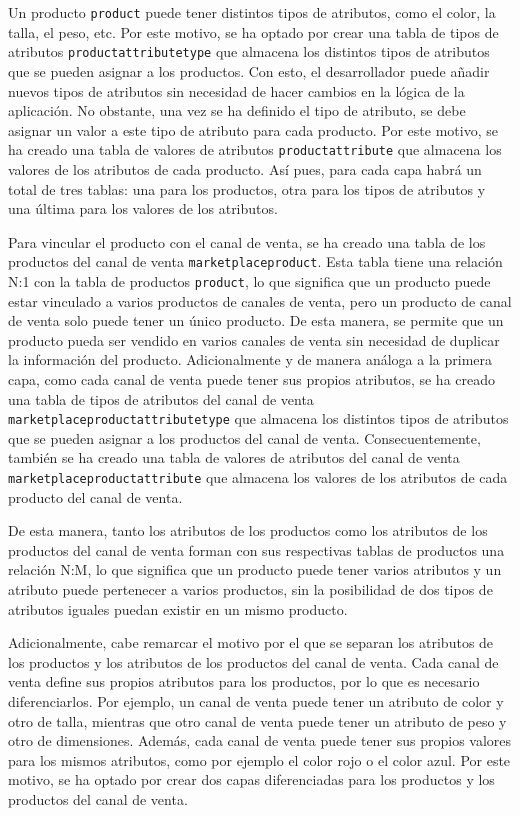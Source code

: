 Un producto \texttt{product} puede tener distintos tipos de atributos, como el color, la talla, el peso, etc. Por este motivo, se ha optado por crear una tabla de tipos de atributos \texttt{productattributetype} que almacena los distintos tipos de atributos que se pueden asignar a los productos. Con esto, el desarrollador puede añadir nuevos tipos de atributos sin necesidad de hacer cambios en la lógica de la aplicación. No obstante, una vez se ha definido el tipo de atributo, se debe asignar un valor a este tipo de atributo para cada producto. Por este motivo, se ha creado una tabla de valores de atributos \texttt{productattribute} que almacena los valores de los atributos de cada producto. Así pues, para cada capa habrá un total de tres tablas: una para los productos, otra para los tipos de atributos y una última para los valores de los atributos.

Para vincular el producto con el canal de venta, se ha creado una tabla de los productos del canal de venta \texttt{marketplaceproduct}. Esta tabla tiene una relación N:1 con la tabla de productos \texttt{product}, lo que significa que un producto puede estar vinculado a varios productos de canales de venta, pero un producto de canal de venta solo puede tener un único producto. De esta manera, se permite que un producto pueda ser vendido en varios canales de venta sin necesidad de duplicar la información del producto. Adicionalmente y de manera análoga a la primera capa, como cada canal de venta puede tener sus propios atributos, se ha creado una tabla de tipos de atributos del canal de venta \texttt{marketplaceproductattributetype} que almacena los distintos tipos de atributos que se pueden asignar a los productos del canal de venta. Consecuentemente, también se ha creado una tabla de valores de atributos del canal de venta \texttt{marketplaceproductattribute} que almacena los valores de los atributos de cada producto del canal de venta.

De esta manera, tanto los atributos de los productos como los atributos de los productos del canal de venta forman con sus respectivas tablas de productos una relación N:M, lo que significa que un producto puede tener varios atributos y un atributo puede pertenecer a varios productos, sin la posibilidad de dos tipos de atributos iguales puedan existir en un mismo producto.

Adicionalmente, cabe remarcar el motivo por el que se separan los atributos de los productos y los atributos de los productos del canal de venta. Cada canal de venta define sus propios atributos para los productos, por lo que es necesario diferenciarlos. Por ejemplo, un canal de venta puede tener un atributo de color y otro de talla, mientras que otro canal de venta puede tener un atributo de peso y otro de dimensiones. Además, cada canal de venta puede tener sus propios valores para los mismos atributos, como por ejemplo el color rojo o el color azul. Por este motivo, se ha optado por crear dos capas diferenciadas para los productos y los productos del canal de venta.

